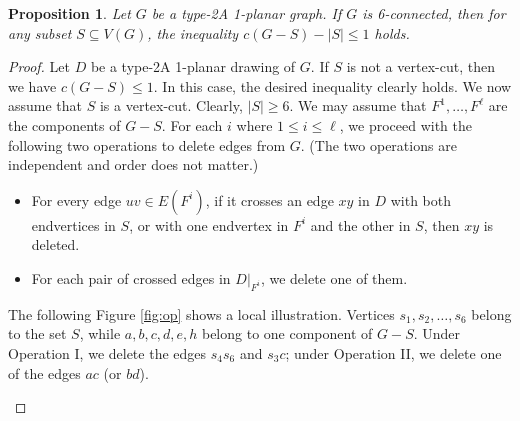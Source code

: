\documentclass[12pt,a4paper]{article}
\newtheorem{prop}{Proposition}[section]
\begin{document}
\begin{prop}\label{prop:main}
Let $G$ be a  type-2A 1-planar graph. If $G$ is 6-connected, then for any subset $S \subseteq V(G)$,  the inequality $c(G - S) -|S|\le 1$ holds.
\end{prop}
\begin{proof}
Let $D$ be a type-2A 1-planar  drawing of $G$. If $S$ is not a vertex-cut, then we have
$
 c(G-S) \leq 1
$.
In this case, the desired inequality clearly holds. We now  assume that $S$ is a vertex-cut. Clearly, $|S|\ge 6$. We may assume that $F^1, \ldots, F^\ell$ are the components of $G-S$.
For each $i$ where $1\le i\le \ell$, we proceed with the following two operations to delete edges from $G$. (The two operations are independent and order does not matter.)


\begin{itemize}
 \item[I.]  For every edge $uv \in E(F^i)$, if it crosses an edge $xy$ in $D$ with both endvertices in $S$, or with one endvertex in $F^i$ and the other in $S$, then $xy$ is deleted.
  \item[II.] For each pair of crossed edges in $D|_{F^i}$,  we delete one of them.
\end{itemize}


The following Figure \ref{fig:op} shows a local illustration. Vertices $s_1,s_2,\dots,s_6$ belong to the set $S$, while $a,b,c,d,e,h$ belong to one component of $G-S$.
Under Operation I, we delete the edges $s_4s_6$ and $s_3c$; under Operation II, we delete one of the edges $ac$ (or $bd$).

\begin{figure}[H]
\centering
{}
\end{figure}
\end{proof}
\end{document}
